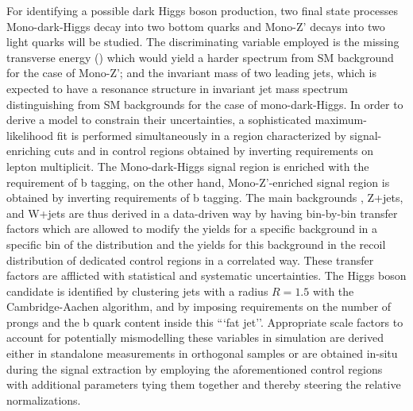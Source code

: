 For identifying a possible dark Higgs boson production, two final state processes Mono-dark-Higgs decay into two bottom quarks and Mono-Z' decays into two light quarks will be studied. The discriminating variable employed is the missing transverse energy (\ptmiss) which would yield a harder \ptmiss spectrum from SM background for the case of Mono-Z'; and the invariant mass of two leading jets, which is expected to have a resonance structure in invariant jet mass spectrum distinguishing from SM backgrounds for the case of mono-dark-Higgs. In order to derive a model to constrain their uncertainties, a sophisticated maximum-likelihood fit is performed simultaneously in a region characterized by signal-enriching cuts and in control regions obtained by inverting requirements on lepton multiplicit. The Mono-dark-Higgs signal region is enriched with the requirement of b tagging, on the other hand, Mono-Z'-enriched signal region is obtained by inverting requirements of b tagging. The main backgrounds \ttbar, Z+jets, and W+jets are thus derived in a data-driven way by having bin-by-bin transfer factors which are allowed to modify the yields for a specific background in a specific bin of the \ptmiss distribution and the yields for this background in the recoil distribution of dedicated control regions in a correlated way. These transfer factors are afflicted with statistical and systematic uncertainties. The Higgs boson candidate is identified by clustering jets with a radius $R=1.5$ with the Cambridge-Aachen algorithm, and by imposing requirements on the number of prongs and the b quark content inside this ```fat jet''. Appropriate scale factors to account for potentially mismodelling these variables in simulation are derived either in standalone measurements in orthogonal samples or are obtained in-situ during the signal extraction by employing the aforementioned control regions with additional parameters tying them together and thereby steering the relative normalizations. 



